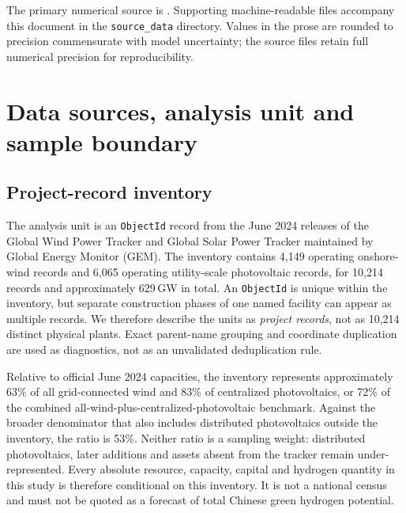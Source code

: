 \documentclass[11pt,a4paper]{article}
\begin{document}
The primary numerical source is . Supporting machine-readable files accompany this document in the \texttt{source\_data} directory. Values in the prose are rounded to precision commensurate with model uncertainty; the source files retain full numerical precision for reproducibility.

\begingroup
\footnotesize
\setlength{\parskip}{0pt}
\tableofcontents
\endgroup

\clearpage
\linenumbers

\section{Data sources, analysis unit and sample boundary}\label{sec:data}

\subsection{Project-record inventory}

The analysis unit is an \texttt{ObjectId} record from the June 2024 releases of the Global Wind Power Tracker and Global Solar Power Tracker maintained by Global Energy Monitor (GEM)\cite{gem2024}. The inventory contains 4,149 operating onshore-wind records and 6,065 operating utility-scale photovoltaic records, for 10,214 records and approximately 629\,GW in total. An \texttt{ObjectId} is unique within the inventory, but separate construction phases of one named facility can appear as multiple records. We therefore describe the units as \emph{project records}, not as 10,214 distinct physical plants. Exact parent-name grouping and coordinate duplication are used as diagnostics, not as an unvalidated deduplication rule.

Relative to official June 2024 capacities, the inventory represents approximately 63\% of all grid-connected wind and 83\% of centralized photovoltaics, or 72\% of the combined all-wind-plus-centralized-photovoltaic benchmark\cite{nea2024capacity}. Against the broader denominator that also includes distributed photovoltaics outside the inventory, the ratio is 53\%. Neither ratio is a sampling weight: distributed photovoltaics, later additions and assets absent from the tracker remain under-represented. Every absolute resource, capacity, capital and hydrogen quantity in this study is therefore conditional on this inventory. It is not a national census and must not be quoted as a forecast of total Chinese green hydrogen potential.
\end{document}
